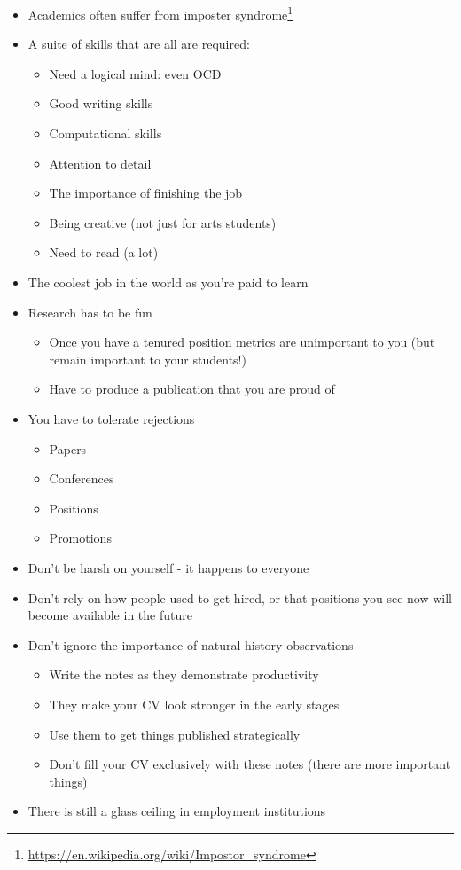 \documentclass[
]{krantz}
\providecommand{\tightlist}{%
  \setlength{\itemsep}{0pt}\setlength{\parskip}{0pt}}
\renewcommand{\href}[2]{#2\footnote{\url{#1}}}
\begin{document}
\begin{itemize}
\tightlist
\item
  Academics often suffer from \href{https://en.wikipedia.org/wiki/Impostor_syndrome}{imposter syndrome}
\item
  A suite of skills that are all are required:

  \begin{itemize}
  \tightlist
  \item
    Need a logical mind: even OCD
  \item
    Good writing skills
  \item
    Computational skills
  \item
    Attention to detail
  \item
    The importance of finishing the job
  \item
    Being creative (not just for arts students)
  \item
    Need to read (a lot)
  \end{itemize}
\item
  The coolest job in the world as you're paid to learn
\item
  Research has to be fun

  \begin{itemize}
  \tightlist
  \item
    Once you have a tenured position metrics are unimportant to you (but remain important to your students!)
  \item
    Have to produce a publication that you are proud of
  \end{itemize}
\item
  You have to tolerate rejections

  \begin{itemize}
  \tightlist
  \item
    Papers
  \item
    Conferences
  \item
    Positions
  \item
    Promotions
  \end{itemize}
\item
  Don't be harsh on yourself - it happens to everyone
\item
  Don't rely on how people used to get hired, or that positions you see now will become available in the future
\item
  Don't ignore the importance of natural history observations

  \begin{itemize}
  \tightlist
  \item
    Write the notes as they demonstrate productivity
  \item
    They make your CV look stronger in the early stages
  \item
    Use them to get things published strategically
  \item
    Don't fill your CV exclusively with these notes (there are more important things)
  \end{itemize}
\item
  There is still a glass ceiling in employment institutions


\end{itemize}
\end{document}
